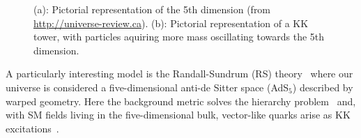\begin{figure}[htb]\begin{center}
	\caption{(a): Pictorial representation of
          the 5th dimension (from \url{http://universe-review.ca}). 
          (b): Pictorial representation of a KK tower, with 
        particles aquiring more mass oscillating towards the
        5th dimension.}
\end{center}\end{figure}

A particularly interesting model is the Randall-Sundrum (RS)
theory~\cite{Randall:1999vf,Contino:2006nn}
where our universe is considered a 
five-dimensional anti-de Sitter space (AdS$_5$)
described by warped geometry. Here the background metric
solves the hierarchy problem~\cite{Randall:1999ee}
and, with SM fields living in the five-dimensional bulk,
vector-like quarks arise as KK excitations~\cite{delAguila:2000kb}.
